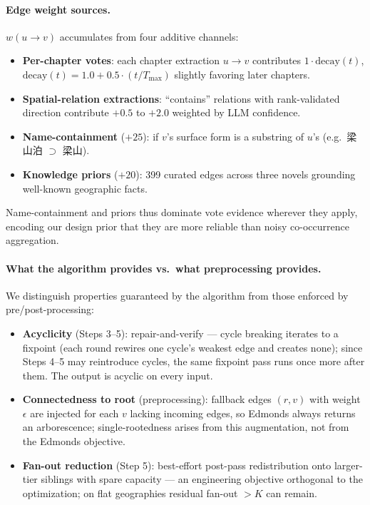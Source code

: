 \documentclass[11pt]{article}
\newenvironment{CJK}[2]{}{}
\begin{document}
\paragraph{Edge weight sources.}
$w(u \rightarrow v)$ accumulates from four additive channels:
\begin{itemize}
\item \textbf{Per-chapter votes}: each chapter extraction $u \rightarrow v$ contributes $1 \cdot \text{decay}(t)$, $\text{decay}(t) = 1.0 + 0.5 \cdot (t / T_{\max})$ slightly favoring later chapters.
\item \textbf{Spatial-relation extractions}: ``contains'' relations with rank-validated direction contribute $+0.5$ to $+2.0$ weighted by LLM confidence.
\item \textbf{Name-containment} ($+25$): if $v$'s surface form is a substring of $u$'s (e.g.\ \begin{CJK}{UTF8}{gbsn}梁山泊\end{CJK} $\supset$ \begin{CJK}{UTF8}{gbsn}梁山\end{CJK}).
\item \textbf{Knowledge priors} ($+20$): 399 curated edges across three novels grounding well-known geographic facts.
\end{itemize}
Name-containment and priors thus dominate vote evidence wherever they apply, encoding our design prior that they are more reliable than noisy co-occurrence aggregation.

\paragraph{What the algorithm provides vs.\ what preprocessing provides.}
We distinguish properties guaranteed by the algorithm from those enforced by pre/post-processing:

\begin{itemize}
\item \textbf{Acyclicity} (Steps 3--5): repair-and-verify --- cycle breaking iterates to a fixpoint (each round rewires one cycle's weakest edge and creates none); since Steps 4--5 may reintroduce cycles, the same fixpoint pass runs once more after them. The output is acyclic on every input.
\item \textbf{Connectedness to root} (preprocessing): fallback edges $(r, v)$ with weight $\epsilon$ are injected for each $v$ lacking incoming edges, so Edmonds always returns an arborescence; single-rootedness arises from this augmentation, not from the Edmonds objective.
\item \textbf{Fan-out reduction} (Step 5): best-effort post-pass redistribution onto larger-tier siblings with spare capacity --- an engineering objective orthogonal to the optimization; on flat geographies residual fan-out $> K$ can remain.
\end{itemize}
\end{document}
